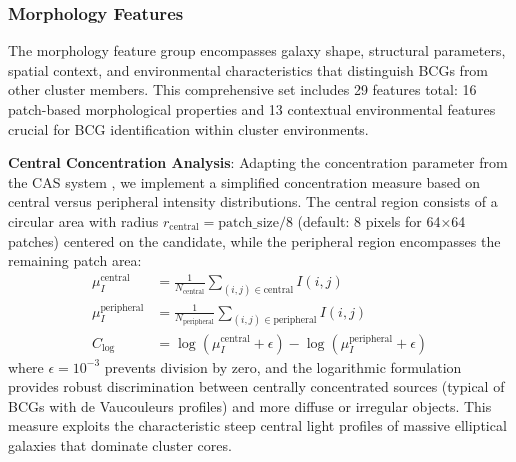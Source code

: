 \documentclass[twocolumn,10pt]{aastex631}
\begin{document}
\subsubsection{Morphology Features}

The morphology feature group encompasses galaxy shape, structural parameters, spatial context, and environmental characteristics that distinguish BCGs from other cluster members. This comprehensive set includes 29 features total: 16 patch-based morphological properties and 13 contextual environmental features crucial for BCG identification within cluster environments.

\textbf{Central Concentration Analysis}: Adapting the concentration parameter from the CAS system \citep{Conselice2003}, we implement a simplified concentration measure based on central versus peripheral intensity distributions. The central region consists of a circular area with radius $r_{\text{central}} = \text{patch\_size}/8$ (default: 8 pixels for 64×64 patches) centered on the candidate, while the peripheral region encompasses the remaining patch area:
\begin{align}
\mu_I^{\text{central}} &= \frac{1}{N_{\text{central}}} \sum_{(i,j) \in \text{central}} I(i,j) \\
\mu_I^{\text{peripheral}} &= \frac{1}{N_{\text{peripheral}}} \sum_{(i,j) \in \text{peripheral}} I(i,j) \\
C_{\text{log}} &= \log(\mu_I^{\text{central}} + \epsilon) - \log(\mu_I^{\text{peripheral}} + \epsilon)
\end{align}
where $\epsilon = 10^{-3}$ prevents division by zero, and the logarithmic formulation provides robust discrimination between centrally concentrated sources (typical of BCGs with de Vaucouleurs profiles) and more diffuse or irregular objects. This measure exploits the characteristic steep central light profiles of massive elliptical galaxies that dominate cluster cores.
\end{document}
